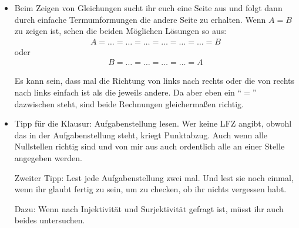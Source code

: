 \documentclass[11pt, a4paper]{article}
\begin{document}
\begin{itemize}
\item Beim Zeigen von Gleichungen sucht ihr euch eine Seite aus und folgt dann durch einfache Termumformungen die andere Seite zu erhalten. Wenn $A = B$ zu zeigen ist, sehen die beiden Möglichen Lösungen so aus:
\begin{align*}
A = \dots = \dots = \dots = \dots = \dots = \dots = B
\end{align*}
oder
\begin{align*}
B = \dots = \dots = \dots = \dots = A
\end{align*}

Es kann sein, dass mal die Richtung von links nach rechts oder die von rechts nach links einfach ist als die jeweils andere. Da aber eben ein \enquote{$=$} dazwischen steht, sind beide Rechnungen gleichermaßen richtig.

\item Tipp für die Klausur: Aufgabenstellung lesen. Wer keine LFZ angibt, obwohl das in der Aufgabenstellung steht, kriegt Punktabzug. Auch wenn alle Nullstellen richtig sind und von mir aus auch ordentlich alle an einer Stelle angegeben werden. 

Zweiter Tipp: Lest jede Aufgabenstellung zwei mal. Und lest sie noch einmal, wenn ihr glaubt fertig zu sein, um zu checken, ob ihr nichts vergessen habt.

Dazu: Wenn nach Injektivität und Surjektivität gefragt ist, müsst ihr auch beides untersuchen.

\smiley{}



\end{itemize}

%
%
%
%
%
%
%
%
\end{document}

